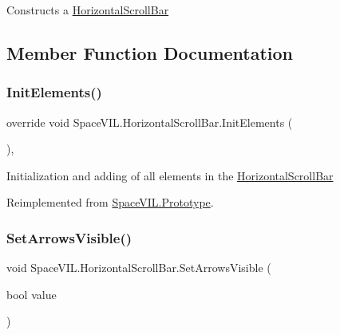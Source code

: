 Constructs a \mbox{\hyperlink{class_space_v_i_l_1_1_horizontal_scroll_bar}{Horizontal\+Scroll\+Bar}} 



\subsection{Member Function Documentation}
\mbox{\label{class_space_v_i_l_1_1_horizontal_scroll_bar_a28b7659ed7580fee8b4bf4fb951f1daa}} 
\subsubsection{\texorpdfstring{Init\+Elements()}{InitElements()}}
{\footnotesize\ttfamily override void Space\+V\+I\+L.\+Horizontal\+Scroll\+Bar.\+Init\+Elements (\begin{DoxyParamCaption}{ }\end{DoxyParamCaption})\hspace{0.3cm}{\ttfamily [inline]}, {\ttfamily [virtual]}}



Initialization and adding of all elements in the \mbox{\hyperlink{class_space_v_i_l_1_1_horizontal_scroll_bar}{Horizontal\+Scroll\+Bar}} 



Reimplemented from \mbox{\hyperlink{class_space_v_i_l_1_1_prototype_ac3379fe02923ee155b5b0084abf27420}{Space\+V\+I\+L.\+Prototype}}.

\mbox{\label{class_space_v_i_l_1_1_horizontal_scroll_bar_a5fb41915b15f89e13da665dab8fa3b31}} 
\subsubsection{\texorpdfstring{Set\+Arrows\+Visible()}{SetArrowsVisible()}}
{\footnotesize\ttfamily void Space\+V\+I\+L.\+Horizontal\+Scroll\+Bar.\+Set\+Arrows\+Visible (\begin{DoxyParamCaption}\item[{bool}]{value }\end{DoxyParamCaption})\hspace{0.3cm}{\ttfamily [inline]}}




